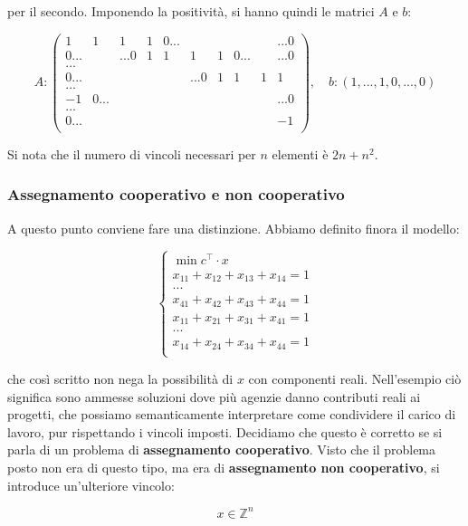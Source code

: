 \documentclass[a4paper,11pt]{article}
\begin{document}
per il secondo.
Imponendo la positività, si hanno quindi le matrici $A$ e $b$:

$$
A: 
\begin{pmatrix}
	1 & 1 & 1 & 1 & 0... & &  & & & ...0 \\
	0... & & ...0 & 1 & 1 & 1 & 1 & 0... & & ...0 \\
	... \\
	0... & &  & & & ...0 & 1 & 1 & 1 & 1 \\
	...\\
	-1 & 0... & & & & & & & & ...0 \\
	...\\
	0... & & & & & & & & & -1 \\
\end{pmatrix}, \quad 
b: ( 1, ..., 1, 0, ..., 0)
$$

Si nota che il numero di vincoli necessari per $n$ elementi è $2n + n^2$.

\subsubsection{Assegnamento cooperativo e non cooperativo}
A questo punto conviene fare una distinzione.
Abbiamo definito finora il modello:

\[
	\begin{cases}
		\min{c^\intercal \cdot x} \\
		x_{11} + x_{12} + x_{13} + x_{14} = 1	\\
		...\\
		x_{41} + x_{42} + x_{43} + x_{44} = 1 \\
		x_{11} + x_{21} + x_{31} + x_{41} = 1	\\
		...\\
		x_{14} + x_{24} + x_{34} + x_{44} = 1 \\ 
 
	\end{cases}
\]

che così scritto non nega la possibilità di $x$ con componenti reali.
Nell'esempio ciò significa sono ammesse soluzioni dove più agenzie danno contributi reali ai progetti, che possiamo semanticamente interpretare come condividere il carico di lavoro, pur rispettando i vincoli imposti.
Decidiamo che questo è corretto se si parla di un problema di \textbf{assegnamento cooperativo}.
Visto che il problema posto non era di questo tipo, ma era di \textbf{assegnamento non cooperativo}, si introduce un'ulteriore vincolo:

$$
	x \in \mathbb{Z}^n
$$
\end{document}

